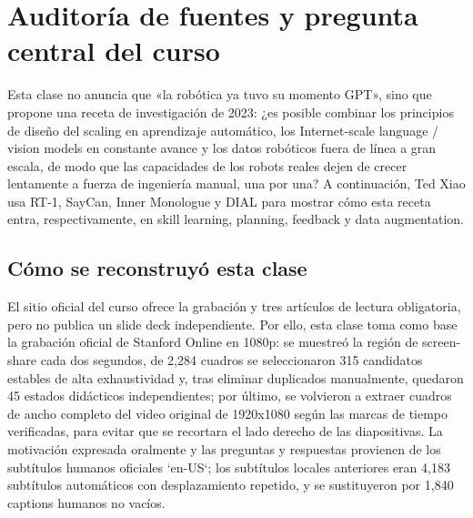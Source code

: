 \section{Auditoría de fuentes y pregunta central del curso}

Esta clase no anuncia que «la robótica ya tuvo su momento GPT», sino que propone una receta de investigación de 2023: ¿es posible combinar los principios de diseño del scaling en aprendizaje automático, los Internet-scale language / vision models en constante avance y los datos robóticos fuera de línea a gran escala, de modo que las capacidades de los robots reales dejen de crecer lentamente a fuerza de ingeniería manual, una por una? A continuación, Ted Xiao usa RT-1, SayCan, Inner Monologue y DIAL para mostrar cómo esta receta entra, respectivamente, en skill learning, planning, feedback y data augmentation.

\subsection{Cómo se reconstruyó esta clase}

El sitio oficial del curso ofrece la grabación y tres artículos de lectura obligatoria, pero no publica un slide deck independiente. Por ello, esta clase toma como base la grabación oficial de Stanford Online en 1080p: se muestreó la región de screen-share cada dos segundos, de 2,284 cuadros se seleccionaron 315 candidatos estables de alta exhaustividad y, tras eliminar duplicados manualmente, quedaron 45 estados didácticos independientes; por último, se volvieron a extraer cuadros de ancho completo del video original de 1920x1080 según las marcas de tiempo verificadas, para evitar que se recortara el lado derecho de las diapositivas. La motivación expresada oralmente y las preguntas y respuestas provienen de los subtítulos humanos oficiales `en-US`; los subtítulos locales anteriores eran 4,183 subtítulos automáticos con desplazamiento repetido, y se sustituyeron por 1,840 captions humanos no vacíos.

